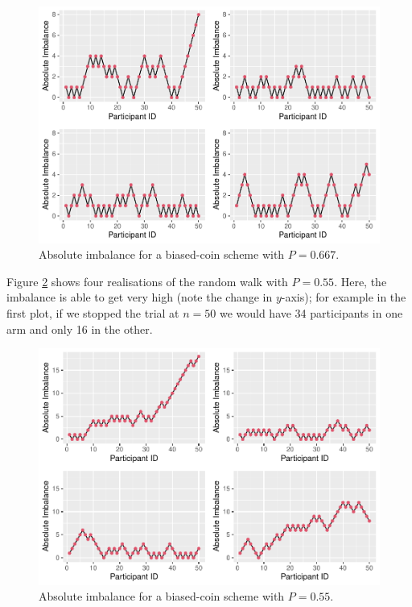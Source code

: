 \documentclass[
  openany]{book}
\theoremstyle{definition}
\theoremstyle{definition}
\theoremstyle{definition}
\theoremstyle{definition}
\theoremstyle{remark}
\begin{document}
\begin{figure}
\centering
\includegraphics{CT4H_notes_files/figure-latex/biasedcoin-p2thirds-1.pdf}
\caption{\label{fig:biasedcoin-p2thirds}Absolute imbalance for a biased-coin scheme with \(P=0.667\).}
\end{figure}

Figure \ref{fig:p-nearlyhalf} shows four realisations of the random walk with \(P=0.55\). Here, the imbalance is able to get very high (note the change in \(y\)-axis); for example in the first plot, if we stopped the trial at \(n=50\) we would have 34 participants in one arm and only 16 in the other.

\begin{figure}
\centering
\includegraphics{CT4H_notes_files/figure-latex/p-nearlyhalf-1.pdf}
\caption{\label{fig:p-nearlyhalf}Absolute imbalance for a biased-coin scheme with \(P = 0.55\).}
\end{figure}
\end{document}
